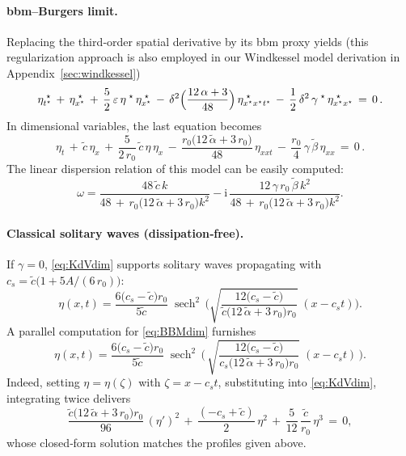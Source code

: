 \documentclass[alpha-refs, 12pt]{wiley-article}
\DeclareMathOperator{\sech}{sech}
\newcommand{\ui}{\mathrm{i}}
\newcommand{\eps}{\varepsilon}
\begin{document}
\paragraph{\acrshort{bbm}--Burgers limit.} Replacing the third‐order spatial derivative by its \acrshort{bbm} proxy yields (this regularization approach is also employed in our Windkessel model derivation in Appendix~\ref{sec:windkessel})
\begin{equation}\label{eq:5.11}
  \eta^{\;\star}_{t^{\star}}\,+\,\eta^{\;\star}_{x^{\star}}
  \,+\,\frac{5}{2}\,\eps\,\eta^{\;\star}\,\eta^{\;\star}_{x^{\star}}
  \,-\,\delta^{2}\Bigl(\frac{12\,\alpha+3}{48}\Bigr)\,\eta^{\;\star}_{x^{\star}x^{\star}t^{\star}}
  \,-\,\frac{1}{2}\,\delta^{2}\,\gamma^{\;\star}\,\eta^{\;\star}_{x^{\star}x^{\star}}\,=\,0\,.
\end{equation}
In dimensional variables, the last equation becomes
\begin{equation}\label{eq:BBMdim}
  \eta_{t}\,+\,\tilde{c}\,\eta_{x}
  \,+\,\frac{5}{2\,r_{0}}\,\tilde{c}\,\eta\,\eta_{x}
  \,-\,\frac{r_{0}\bigl(12\,\tilde{\alpha}+3\,r_{0}\bigr)}{48}\,\eta_{xxt}
  \,-\,\frac{r_{0}}{4}\,\gamma\,\tilde{\beta}\,\eta_{xx}\,=\,0\,.
\end{equation}
The linear dispersion relation of this model can be easily computed:
\begin{equation}
  \omega=\frac{48\,\tilde{c}\,k}{48\,+\,r_{0}\bigl(12\,\tilde{\alpha}+3\,r_{0}\bigr)k^{2}}
        -\ui\,\frac{12\,\gamma\,r_{0}\,\tilde{\beta}\,k^{2}}
                 {48\,+\,r_{0}\bigl(12\,\tilde{\alpha}+3\,r_{0}\bigr)k^{2}}.
\end{equation}

\paragraph{Classical solitary waves (dissipation‐free).} If $\gamma=0$, \cref{eq:KdVdim} supports solitary waves propagating with $c_{s} = \tilde{c}\bigl(1+5A/(6\,r_{0})\bigr)$:
\begin{equation*}
  \eta(x,t)=\frac{6\bigl(c_{s}-\tilde{c}\bigr)r_{0}}{5\tilde{c}}\;
  \sech^{2}\,\biggl(\sqrt{\frac{12\bigl(c_{s}-\tilde{c}\bigr)}{\tilde{c}\bigl(12\,\tilde{\alpha}+3\,r_{0}\bigr)r_{0}}}\;(x-c_{s}t)\biggr).
\end{equation*}
A parallel computation for \cref{eq:BBMdim} furnishes
\begin{equation*}
  \eta(x,t)=\frac{6\bigl(c_{s}-\tilde{c}\bigr)r_{0}}{5\tilde{c}}\;
  \sech^{2}\,\biggl(\,\sqrt{\frac{12\bigl(c_{s}-\tilde{c}\bigr)}{c_{s}\bigl(12\,\tilde{\alpha}+3\,r_{0}\bigr)r_{0}}}\;(x-c_{s}t)\,\biggr).
\end{equation*}
Indeed, setting $\eta=\eta(\zeta)$ with $\zeta=x-c_{s}t$, substituting into \cref{eq:KdVdim},
integrating twice delivers
\begin{equation*}
  \frac{\tilde{c}\bigl(12\,\tilde{\alpha}+3\,r_{0}\bigr)r_{0}}{96}\,(\eta')^{2}
  \,+\,\frac{(-c_{s}+\tilde{c})}{2}\,\eta^{2}
  \,+\,\frac{5}{12}\,\frac{\tilde{c}}{r_{0}}\,\eta^{3}\,=\,0,
\end{equation*}
whose closed‐form solution matches the profiles given above.
\end{document}
